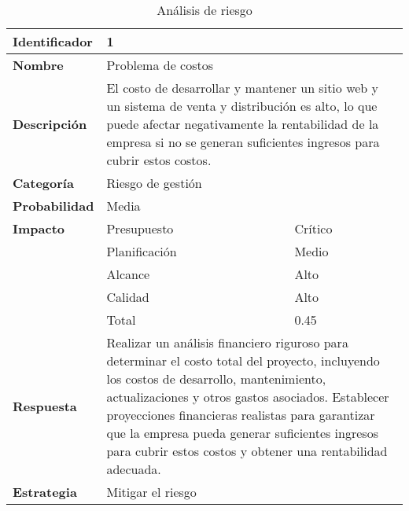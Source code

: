 \begin{table}[htb]
    \centering
    \caption{Análisis de riesgo}
    \label{table:risk_analysis}
    \begin{tabular}{>{\columncolor[rgb]{ .949,  .949,  .949}}l l l}
    \toprule
    \rowcolor[rgb]{ .871,  .918,  .965}
    \textbf{Identificador} & \multicolumn{2}{l}{1} \\
    \midrule
    \textbf{Nombre} & \multicolumn{2}{l}{Problema de costos} \\
    \midrule
    \textbf{Descripción} & \multicolumn{2}{p{10cm}}{El costo de desarrollar y mantener un sitio web y un sistema de venta y distribución es alto, lo que puede afectar negativamente la rentabilidad de la empresa si no se generan suficientes ingresos para cubrir estos costos.} \\
    \midrule
    \textbf{Categoría} & \multicolumn{2}{l}{Riesgo de gestión} \\
    \midrule
    \textbf{Probabilidad} & \multicolumn{2}{l}{Media} \\
    \midrule
    \textbf{Impacto} & Presupuesto & Crítico \\
    \cmidrule(lr){2-3}
    & Planificación & Medio \\
    \cmidrule(lr){2-3}
    & Alcance & Alto \\
    \cmidrule(lr){2-3}
    & Calidad & Alto \\
    \cmidrule(lr){2-3}
    & Total & 0.45 \\
    \midrule
    \textbf{Respuesta} & \multicolumn{2}{p{10cm}}{Realizar un análisis financiero riguroso para determinar el costo total del proyecto, incluyendo los costos de desarrollo, mantenimiento, actualizaciones y otros gastos asociados. Establecer proyecciones financieras realistas para garantizar que la empresa pueda generar suficientes ingresos para cubrir estos costos y obtener una rentabilidad adecuada.} \\
    \midrule
    \textbf{Estrategia} & \multicolumn{2}{l}{Mitigar el riesgo} \\
    \bottomrule
    \end{tabular}
    \end{table}
    